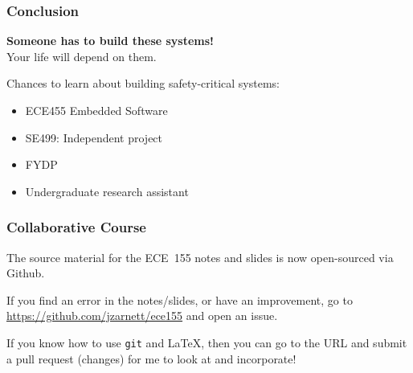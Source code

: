 
\begin{frame}[c]
  \frametitle{Conclusion}
  \textbf{\Large Someone has to build these systems!} \\
  Your life will depend on them.

  \pause

   Chances to learn about building safety-critical systems: \\
   \begin{itemize}
   \item ECE455 Embedded Software
   \item SE499: Independent project
   \item FYDP
   \item Undergraduate research assistant
   \end{itemize}
\end{frame}

\begin{frame}
\frametitle{Collaborative Course}

The source material for the ECE~155 notes and slides is now open-sourced via Github. 

If you find an error in the notes/slides, or have an improvement, go to \url{https://github.com/jzarnett/ece155} and open an issue. 

If you know how to use \texttt{git} and \LaTeX, then you can go to the URL and submit a pull request (changes) for me to look at and incorporate!


\end{frame}




